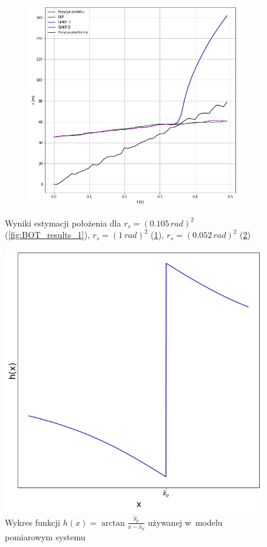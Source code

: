 \begin{figure}
\begin{subfigure}[b]{0.4\linewidth}
		\caption{}
		\label{fig:BOT_results_2}
	\end{subfigure}
	\begin{subfigure}[b]{0.4\linewidth}
		\includegraphics[width=\linewidth]{BOT_results_3.jpg}
		\caption{}
		\label{fig:BOT_results_3}
	\end{subfigure}
	\caption{Wyniki estymacji położenia dla $r_s = (0.105\,rad)^2$ (\ref{fig:BOT_results_1}), $r_s = (1\,rad)^2$ (\ref{fig:BOT_results_2}), $r_s = (0.052\,rad)^2$ (\ref{fig:BOT_results_3})}
	\label{fig:BOT_results}
\end{figure}
\begin{figure}
	\centering
	\includegraphics[width=0.4\linewidth]{BOT_h_function.jpg}
	\caption{Wykres funkcji $h(x) = \arctan \frac{\bar{y}_p}{x - \bar{x}_p}$ używanej w~modelu pomiarowym systemu} 
	\label{fig:BOT_h_function}
\end{figure}

